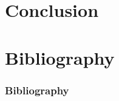 \documentclass{beamer}
\begin{document}
	\section{Conclusion}
	
	\section{Bibliography}
	
		\begin{frame}[allowframebreaks] 
			\frametitle{Bibliography}
			
			
		\end{frame}
		
\end{document}
